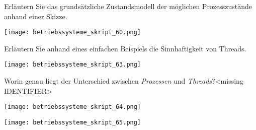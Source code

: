 \documentclass{article}
\begin{document}
\begin{tcolorbox}[colback=white!10!white,colframe=lightgray!75!black,
  savelowerto=\jobname_ex.tex,breakable,enhanced,lines before break=40]

\justifying
Erläutern Sie das grundsätzliche Zustandsmodell der möglichen Prozesszustände anhand einer Skizze.

\tcblower

\justifying
\begin{center}
\texttt{[image: betriebssysteme\_skript\_60.png]}
\end{center}

\end{tcolorbox}
\begin{tcolorbox}[colback=white!10!white,colframe=lightgray!75!black,
  savelowerto=\jobname_ex.tex,breakable,enhanced,lines before break=40]

\justifying
Erläutern Sie anhand eines einfachen Beispiels die Sinnhaftigkeit von Threads.

\tcblower

\justifying
\begin{center}
\texttt{[image: betriebssysteme\_skript\_63.png]}
\end{center}

\end{tcolorbox}
\begin{tcolorbox}[colback=white!10!white,colframe=lightgray!75!black,
  savelowerto=\jobname_ex.tex,breakable,enhanced,lines before break=40]

\justifying
Worin genau liegt der Unterschied zwischen \textit{Prozessen} und \textit{Threads}?<missing IDENTIFIER>

\tcblower

\justifying
\begin{center}
\texttt{[image: betriebssysteme\_skript\_64.png]}
\end{center}
\begin{center}
\texttt{[image: betriebssysteme\_skript\_65.png]}
\end{center}

\end{tcolorbox}
\end{document}
